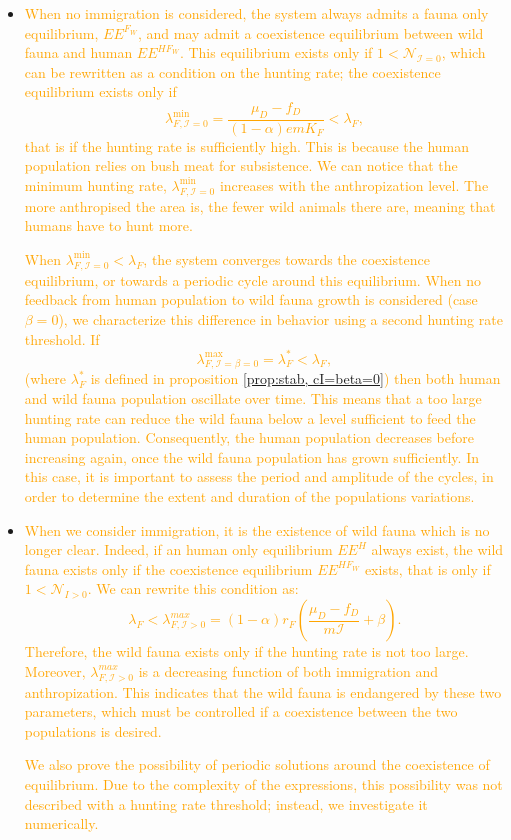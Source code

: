 \documentclass{article}
\newcommand{\lfw}{\lambda_{F}}
\newcommand{\lfw}{\lambda_{F}}
\newcommand{\cI}{\mathcal{I}}
\newcommand{\N}{\mathcal{N}}
\newcommand{\vdeux}[1]{\textcolor{orange}{#1}}
\theoremstyle{definition}
\theoremstyle{remark}
\begin{document}
\begin{itemize}
\item \vdeux{When no immigration is considered, the system always admits a fauna only equilibrium, $EE^{F_W}$, and may admit a coexistence equilibrium between wild fauna and human $EE^{HF_W}$. This equilibrium exists only if $1 < \N_{\cI = 0}$, which can be rewritten as a condition on the hunting rate; the coexistence equilibrium exists only if 
$$
\lambda_{F, \cI = 0}^{\min} = \dfrac{\mu_D - f_D}{(1-\alpha) e m K_F} < \lfw,
$$ that is if the hunting rate is sufficiently high. 
This is because the human population relies on bush meat for subsistence. We can notice that the minimum hunting rate, $\lambda_{F, \cI = 0}^{\min}$ increases with the anthropization level. The more anthropised the area is, the fewer wild animals there are, meaning that humans have to hunt more.
}

\vdeux{
When $\lambda_{F, \cI = 0}^{\min} < \lfw $, the system converges towards the coexistence equilibrium, or towards a periodic cycle around this equilibrium. When no feedback from human population to wild fauna growth is considered (case $\beta = 0$), we characterize this difference in behavior using a second hunting rate threshold. If 
$$
\lambda_{F, \cI=\beta=0}^{\max} = \lfw^* < \lfw,
$$ (where $\lfw^*$ is defined in proposition \ref{prop:stab, cI=beta=0}) then both human and wild fauna population oscillate over time. This means that a too large hunting rate can reduce the wild fauna below a level sufficient to feed the human population. Consequently, the human population decreases before increasing again, once the wild fauna population has grown sufficiently. In this case, it is important to assess the period and amplitude of the cycles, in order to determine the extent and duration of  the populations variations.
}

\item \vdeux{When we consider immigration, it is the existence of wild fauna which is no longer clear. Indeed, if an human only equilibrium $EE^{H}$ always exist, the wild fauna exists only if the coexistence equilibrium $EE^{HF_W}$ exists, that is only if $1 < \N_{I>0}$. We can rewrite this condition as:
$$
\lfw < \lambda_{F, \cI > 0}^{max} = (1-\alpha) r_F\left(\dfrac{\mu_D - f_D}{m \cI} + \beta \right).
$$
Therefore, the wild fauna exists only if the hunting rate is not too large. Moreover, $\lambda_{F, \cI > 0}^{max}$ is a decreasing function of both immigration and anthropization. This indicates that the wild fauna is endangered by these two parameters, which must be controlled if a coexistence between the two populations is desired.
}

\vdeux{
We also prove the possibility of periodic solutions around the coexistence of equilibrium. Due to the complexity of the expressions, this possibility was not described with a hunting rate threshold; instead, we investigate it numerically.
}
\end{itemize}
\end{document}
